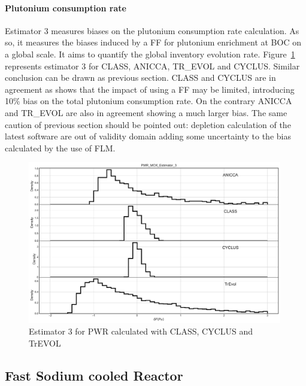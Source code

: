 \paragraph{Plutonium consumption rate}
Estimator 3 measures biases on the plutonium consumption rate calculation. As so, it measures the biases induced by a FF for plutonium enrichment at BOC on a global scale. It aims to quantify the global inventory evolution rate. 
Figure~\ref{fig:Est3_PWR} represents estimator 3 for CLASS, ANICCA, TR\_EVOL and CYCLUS. Similar conclusion can be drawn as previous section. CLASS and CYCLUS are in agreement as shows that the impact of using a FF may be limited, introducing 10\% bias on the total plutonium consumption rate. On the contrary ANICCA and TR\_EVOL are also in agreement showing a much larger bias. The same caution of previous section should be pointed out: depletion calculation of the latest software are out of validity domain adding some uncertainty to the bias calculated by the use of FLM.       

\begin{figure}[h]
	\begin{center}
		\includegraphics[width = 0.99\textwidth]{../../Feature_1/RAW_DATA/FIG/PWR_MOX_Estimator_3.pdf}
		\caption{Estimator 3 for PWR calculated with CLASS, CYCLUS and TrEVOL}
		\label{fig:Est3_PWR}
	\end{center}
\end{figure}

\subsection{Fast Sodium cooled Reactor}
